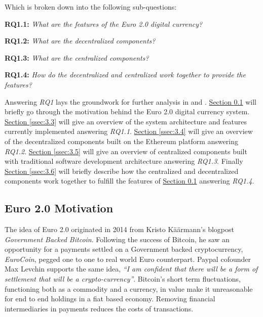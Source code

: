 \documentclass[a4paper,12pt]{article} %
\newcommand{\hypernameref}[1]{\hyperref[#1]{\nameref{#1}}}
\newcommand{\hypersectionref}[1]{\hyperref[#1]{Section \ref{#1}}}
\begin{document}
Which is broken down into the following sub-questions:
\begin{quoting}
	\textbf{RQ1.1: }\textit{What are the features of the Euro 2.0 digital currency?}
\end{quoting}{
\begin{quoting}
	\textbf{RQ1.2: }\textit{What are the decentralized components?}
\end{quoting}{
\begin{quoting}
	\textbf{RQ1.3: }\textit{What are the centralized components?}
\end{quoting}
\begin{quoting}
	\textbf{RQ1.4: }\textit{How do the decentralized and centralized work together to provide the features?}
\end{quoting}

Answering \textit{RQ1} lays the groundwork for further analysis in \hypernameref{sec:4} and \hypernameref{sec:5}. \hypersectionref{ssec:3.2} will briefly go through the motivation behind the Euro 2.0 digital currency system. \hypersectionref{ssec:3.3} will give an overview of the system architecture and features currently implemented answering \textit{RQ1.1}. \hypersectionref{ssec:3.4} will give an overview of the decentralized components built on the Ethereum platform answering \textit{RQ1.2}. \hypersectionref{ssec:3.5} will give an overview of centralized components built with traditional software development architecture answering \textit{RQ1.3}. Finally \hypersectionref{ssec:3.6} will briefly describe how the centralized and decentralized components work together to fulfill the features of \hypersectionref{ssec:3.2} answering \textit{RQ1.4}.

\subsection{Euro 2.0 Motivation} \label{ssec:3.2}

The idea of Euro 2.0 originated in 2014 from Kristo Käärmann's blogpost \textit{Government Backed Bitcoin}\cite{kaarmann2014government}. Following the success of Bitcoin, he saw an opportunity for a payments settled on a Government backed cryptocurrency, \textit{EuroCoin}, pegged one to one to real world Euro counterpart. Paypal cofounder Max Levchin supports the same idea, \textit{``I am confident that there will be a form of settlement that will be a crypto-currency''}\cite{pando2014levchin}. Bitcoin's short term fluctuations, functioning both as a commodity and a currency, in value make it unreasonable for end to end holdings in a fiat based economy. Removing financial intermediaries in payments reduces the costs of transactions.

}}
\end{document}
